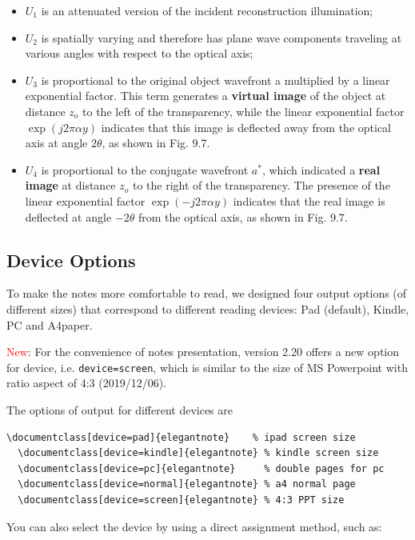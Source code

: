 \documentclass[en,hazy,device=normal,blue,14pt]{elegantnote}
\begin{document}
\begin{itemize}
  \item $U_1$ is an attenuated version of the incident reconstruction illumination;
  \item $U_2$ is spatially varying and therefore has plane wave components traveling at various angles with respect to the optical axis;
  \item $U_3$ is proportional to the original object wavefront a multiplied by a linear exponential factor.  This term generates a \textbf{virtual image} of the object at distance $z_o$ to the left of the transparency, while the
  linear exponential factor $\exp(j2\pi\alpha y)$ indicates that this image is deflected away from the optical axis at angle $2\theta$, as shown in Fig. 9.7.
  \item $U_4$ is proportional to the conjugate wavefront $a^*$, which indicated a \textbf{real image} at distance $z_o$ to the right of the transparency. The presence of the linear exponential factor $\exp(-j2\pi\alpha y)$ indicates that the real image is deflected at angle $-2\theta$ from the optical axis, as shown in Fig. 9.7.
\end{itemize}

\subsection{Device Options}

To make the notes more comfortable to read, we designed four output options (of different sizes) that correspond to different reading devices: Pad (default), Kindle, PC and A4paper. 

\textcolor{red}{New}: For the convenience of notes presentation, version 2.20 offers a new option for device, i.e. \lstinline{device=screen}, which is similar to the size of MS Powerpoint with ratio aspect of 4:3 (2019/12/06).

The options of output for different devices are
\begin{lstlisting}[frame=none]  
  \documentclass[device=pad]{elegantnote}    % ipad screen size
  \documentclass[device=kindle]{elegantnote} % kindle screen size
  \documentclass[device=pc]{elegantnote}     % double pages for pc 
  \documentclass[device=normal]{elegantnote} % a4 normal page
  \documentclass[device=screen]{elegantnote} % 4:3 PPT size
\end{lstlisting}

\begin{note}
You can also select the device by using a direct assignment method, such as:
\end{note}
\end{document}
